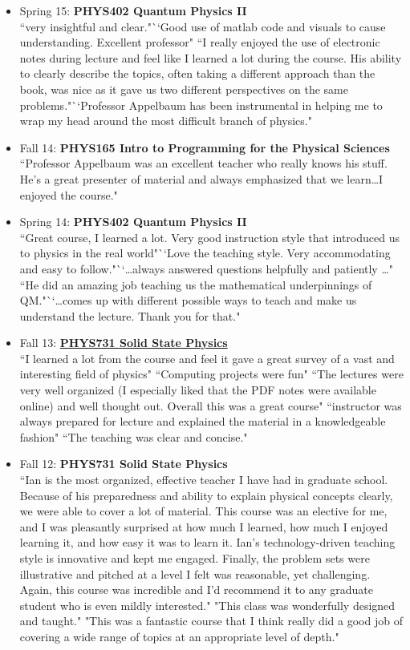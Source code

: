 \documentclass[paper=letter,fontsize=11pt]{scrartcl} %
\newcommand{\CourseEntry}[3]{
		\noindent \item{#1: \textbf{#2} \\ #3}}
\begin{document}
\begin{itemize}
\CourseEntry{Spring 15}{PHYS402 Quantum Physics II}{``very insightful and clear."``Good use of matlab code and visuals to cause understanding. Excellent professor" ``I really enjoyed the use of electronic notes during lecture and feel like I learned a lot during the course. His ability to clearly describe the topics, often taking a different approach than the book, was nice as it gave us two different perspectives on the same problems."``Professor Appelbaum has been instrumental in helping me to wrap my head around the most difficult branch of physics."}

\CourseEntry{Fall 14}{PHYS165 Intro to Programming for the Physical Sciences}
{``Professor Appelbaum was an excellent teacher who really knows his stuff. He's a great presenter of material and always emphasized that we learn\ldots I enjoyed the course."}

\CourseEntry{Spring 14}{PHYS402 Quantum Physics II}{``Great course, I learned a lot. Very good instruction style that introduced us to physics in the real world"``Love the teaching style. Very accommodating and easy to follow."``\ldots always answered questions helpfully and patiently \ldots" ``He did an amazing job teaching us the mathematical underpinnings of QM."``\ldots comes up with different possible ways to teach and make us understand the lecture. Thank you for that."}

\CourseEntry{Fall 13}{\href{http://www.lulu.com/content/paperback-book/solid-state-physics/14362122}{PHYS731 Solid State Physics}}{``I learned a lot from the course and feel it gave a great survey of a vast and interesting field of physics" ``Computing projects were fun" ``The lectures were very well organized (I especially liked that the PDF notes were available online) and well thought out. Overall this was a great course" ``instructor was always prepared for lecture and explained the material in a knowledgeable fashion" ``The teaching was clear and concise."}

\CourseEntry{Fall 12}{PHYS731 Solid State Physics}
{``Ian is the most organized, effective teacher I have had in graduate school. Because of his preparedness and ability to explain physical concepts clearly, we were able to cover a lot of material. This course was an elective for me, and I was pleasantly surprised at how much I learned, how much I enjoyed learning it, and how easy it was to learn it. Ian's technology-driven teaching style is innovative and kept me engaged. Finally, the problem sets were illustrative and pitched at a level I felt was reasonable, yet challenging. Again, this course was incredible and I'd recommend it to any graduate student who is even mildly interested." "This class was wonderfully designed and taught." "This was a fantastic course that I think really did a good job of covering a wide range of topics at an appropriate level of depth."} 


\end{itemize}
\end{document}
